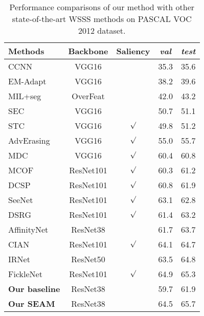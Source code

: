 \documentclass[10pt,twocolumn,letterpaper]{article}
\begin{document}
	\begin{table}[t]
		\centering
		\small
		\begin{tabular}{lcc|cc}
			\hline
			Methods & Backbone & Saliency & \textit{val} & \textit{test}\\
			\hline
			CCNN~\cite{CCNN} & VGG16 & & 35.3 & 35.6\\
			EM-Adapt~\cite{EM-Adapt} & VGG16 & & 38.2 & 39.6\\
			MIL+seg~\cite{MIL} & OverFeat & & 42.0 & 43.2\\
			SEC~\cite{SEC} & VGG16 & & 50.7 & 51.1\\
			STC~\cite{STC} & VGG16 & $\surd$ &49.8 & 51.2\\
			AdvErasing~\cite{AdvErasing} & VGG16 & $\surd$ & 55.0 & 55.7\\
			MDC~\cite{MDC} & VGG16 & $\surd$ & 60.4 & 60.8\\
			MCOF~\cite{MCOF} & ResNet101 &  $\surd$ & 60.3 & 61.2\\
			DCSP~\cite{DCSP} & ResNet101 & $\surd$ & 60.8 & 61.9\\
			SeeNet~\cite{SeeNet} & ResNet101 & $\surd$ & 63.1 & 62.8\\
			DSRG~\cite{DSRG} & ResNet101 & $\surd$ & 61.4 & 63.2\\
			AffinityNet~\cite{AffinityNet} & ResNet38 & & 61.7 & 63.7\\
			CIAN~\cite{CIAN} & ResNet101 & $\surd$ & 64.1 & 64.7\\
			IRNet~\cite{IRNet} & ResNet50 & & 63.5 & 64.8\\
			FickleNet~\cite{FickleNet} & ResNet101 & $\surd$ & 64.9 & 65.3\\
			\hline
			\textbf{Our baseline} & ResNet38 & & 59.7 & 61.9\\
			\textbf{Our SEAM} & ResNet38 & & 64.5 & 65.7\\
			\hline
		\end{tabular}
		\caption{Performance comparisons of our method with other state-of-the-art WSSS methods on PASCAL VOC 2012 dataset.}
		\label{tab:final}
\end{table}
\end{document}
